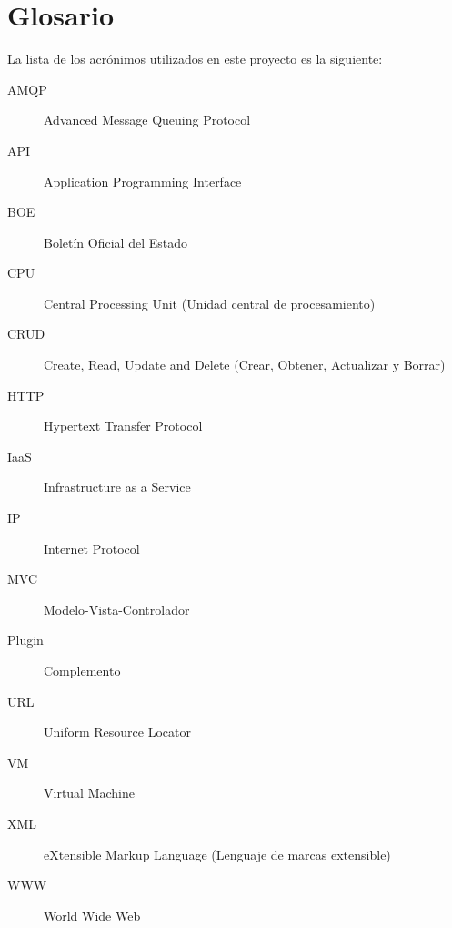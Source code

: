 \chapter{Glosario} 
La lista de los acrónimos utilizados en este proyecto es la siguiente:
\begin{description} 
\item [AMQP] Advanced Message Queuing Protocol 
\item [API] Application Programming Interface
\item [BOE] Boletín Oficial del Estado
\item [CPU] Central Processing Unit (Unidad central de procesamiento)
\item [CRUD] Create, Read, Update and Delete (Crear, Obtener, Actualizar y Borrar)
\item [HTTP] Hypertext Transfer Protocol
\item [IaaS] Infrastructure as a Service
\item [IP] Internet Protocol
\item [MVC] Modelo-Vista-Controlador
\item [Plugin] Complemento 
\item [URL] Uniform Resource Locator
\item [VM] Virtual Machine
\item [XML] eXtensible Markup Language (Lenguaje de marcas extensible)
\item [WWW] World Wide Web
\end{description}
